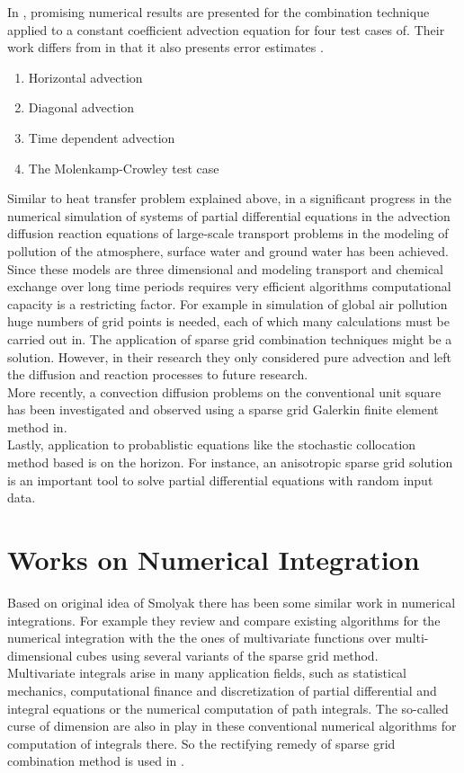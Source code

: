 In \cite{Griebel1999}, promising numerical results are presented for the combination technique applied to a constant coefficient advection equation for four test cases of. Their work differs from \cite{Griebel1999} in that it also presents error estimates \cite{Lastdrager2000}.
\begin{enumerate}
\item Horizontal advection
\item Diagonal advection 
\item Time dependent advection
\item The Molenkamp-Crowley test case
\end{enumerate}
Similar to heat transfer problem explained above, in \cite{Lastdrager2001} a significant progress in the numerical simulation of systems of partial differential equations in the advection diffusion reaction equations of large-scale transport problems in the modeling of pollution of the atmosphere, surface water and ground water has been achieved. Since these models are three dimensional and modeling transport and chemical exchange over long time periods requires very efficient algorithms computational capacity is a restricting factor. For example in simulation of global air pollution huge numbers of grid points is needed, each of which many calculations must be carried out in. The application of sparse grid combination techniques might be a solution. However, in their research they only considered pure advection and left the diffusion and reaction processes to future research\cite{Lastdrager2001}.\\
More recently, a convection diffusion problems on the conventional unit square has been investigated and observed using a sparse grid Galerkin finite element method in\cite{Franz2009}.\\
Lastly, application to probablistic equations like the stochastic collocation method based is on the horizon. For instance, an anisotropic sparse grid solution is an important tool to solve partial differential equations with random input data\cite{Erhel2015}.
\section{Works on Numerical Integration} 
Based on original idea of Smolyak there has been some similar work in numerical integrations. For example \cite{Gerstner1998} they review and compare existing algorithms for the numerical integration with the the ones of multivariate functions over multi-dimensional cubes using several variants of the sparse grid method.\cite{Gerstner1998, smolyak63quadrature}\\
Multivariate integrals arise in many application fields, such as statistical mechanics, computational finance and discretization of partial differential and integral equations or the numerical computation of path integrals. The so-called curse of dimension are also in play in these conventional numerical algorithms for computation of integrals there. So the rectifying remedy of sparse grid combination method is used in \cite{Gerstner1998}.
